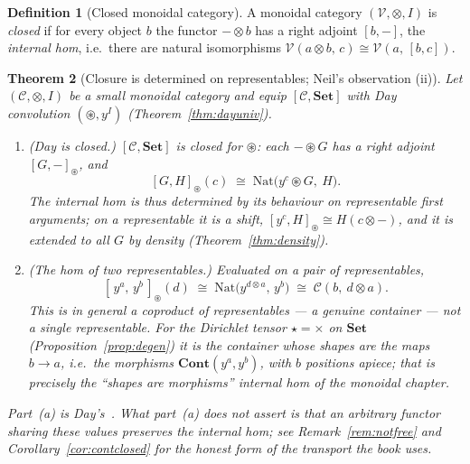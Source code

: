\documentclass[11pt]{article}
\theoremstyle{plain}
\newtheorem{theorem}{Theorem}[section]
\theoremstyle{definition}
\newtheorem{definition}[theorem]{Definition}
\newcommand{\Set}{\mathbf{Set}}
\newcommand{\Cont}{\mathbf{Cont}}
\newcommand{\Nat}{\mathrm{Nat}}
\newcommand{\Day}{\circledast}
\newcommand{\iso}{\cong}
\begin{document}
\begin{definition}[Closed monoidal category]
\label{def:closed}
A monoidal category $(\mathcal{V},\otimes,I)$ is \emph{closed} if for every object
$b$ the functor $-\otimes b$ has a right adjoint $[b,-]$, the \emph{internal hom},
i.e.\ there are natural isomorphisms
$\mathcal{V}(a\otimes b,\,c)\iso\mathcal{V}(a,\,[b,c])$.
\end{definition}

\begin{theorem}[Closure is determined on representables; Neil's observation (ii)]
\label{thm:neil2}
Let $(\mathcal{C},\otimes,I)$ be a small monoidal category and equip
$[\mathcal{C},\Set]$ with Day convolution $(\Day,y^{I})$
(Theorem~\ref{thm:dayuniv}).
\begin{enumerate}
\item[\textup{(a)}] \emph{(Day is closed.)} $[\mathcal{C},\Set]$ is closed for
$\Day$: each $-\Day G$ has a right adjoint $[G,-]_{\Day}$, and
\[
  [G,H]_{\Day}(c)\;\iso\;\Nat\!\bigl(y^{c}\Day G,\ H\bigr).
\]
The internal hom is thus \emph{determined by its behaviour on representable
first arguments}; on a representable it is a shift,
$[y^{c},H]_{\Day}\iso H(c\otimes-)$, and it is extended to all $G$ by density
(Theorem~\ref{thm:density}).
\item[\textup{(b)}] \emph{(The hom of two representables.)} Evaluated on a pair of
representables,
\[
  [\,y^{a},\,y^{b}\,]_{\Day}(d)\;\iso\;\Nat\!\bigl(y^{d\otimes a},\,y^{b}\bigr)
  \;\iso\;\mathcal C(b,\ d\otimes a).
\]
This is in general a \emph{coproduct} of representables --- a genuine container ---
\emph{not} a single representable. For the Dirichlet tensor
$\star=\times$ on $\Set$ (Proposition~\ref{prop:degen}) it is the container whose
shapes are the maps $b\to a$, i.e.\ the morphisms $\Cont(y^{a},y^{b})$, with $b$
positions apiece; that is precisely the ``shapes are morphisms'' internal hom of
the monoidal chapter.
\end{enumerate}
Part~(a) is Day's~\cite{Day1970}. What part~(a) does \emph{not} assert is that an
arbitrary functor sharing these values preserves the internal hom; see
Remark~\ref{rem:notfree} and Corollary~\ref{cor:contclosed} for the honest form of
the transport the book uses.
\end{theorem}
\end{document}
